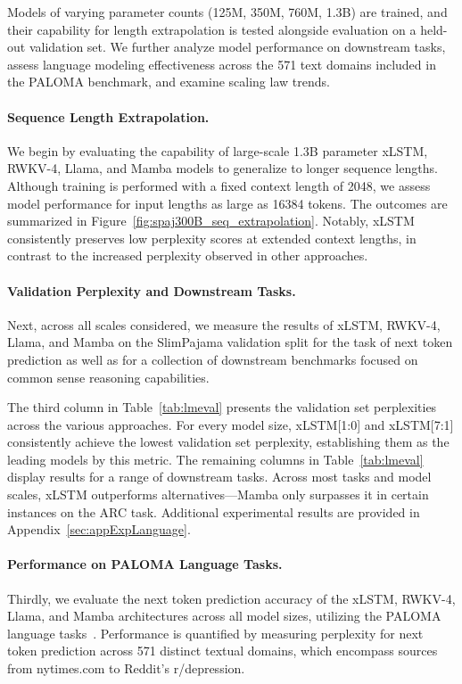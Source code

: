 Models of varying parameter counts (125M, 350M, 760M, 1.3B) are trained, and their capability for length extrapolation is tested alongside evaluation on a held-out validation set. We further analyze model performance on downstream tasks, assess language modeling effectiveness across the 571 text domains included in the PALOMA benchmark, and examine scaling law trends.

\paragraph{Sequence Length Extrapolation.}
\label{sec:spaj300B_ctx_extrapolation}
We begin by evaluating the capability of large-scale 1.3B parameter xLSTM, RWKV-4, Llama, and Mamba models to generalize to longer sequence lengths. Although training is performed with a fixed context length of 2048, we assess model performance for input lengths as large as 16384 tokens. The outcomes are summarized in Figure~\ref{fig:spaj300B_seq_extrapolation}. Notably, xLSTM consistently preserves low perplexity scores at extended context lengths, in contrast to the increased perplexity observed in other approaches.

\paragraph{Validation Perplexity and Downstream Tasks.}
\label{sec:spaj_downstream_eval}
Next, across all scales considered, we measure the results of xLSTM, RWKV-4, Llama, and Mamba on the SlimPajama validation split for the task of next token prediction as well as for a collection of downstream benchmarks focused on common sense reasoning capabilities.

The third column in Table~\ref{tab:lmeval} presents the validation set perplexities across the various approaches. For every model size, xLSTM[1:0] and xLSTM[7:1] consistently achieve the lowest validation set perplexity, establishing them as the leading models by this metric. The remaining columns in Table~\ref{tab:lmeval} display results for a range of downstream tasks. Across most tasks and model scales, xLSTM outperforms alternatives—Mamba only surpasses it in certain instances on the ARC task. Additional experimental results are provided in Appendix~\ref{sec:appExpLanguage}.

\paragraph{Performance on PALOMA Language Tasks.} Thirdly, we evaluate the next token prediction accuracy of the xLSTM, RWKV-4, Llama, and Mamba architectures across all model sizes, utilizing the PALOMA language tasks~\citep{Magnusson:23arxivshort}. Performance is quantified by measuring perplexity for next token prediction across 571 distinct textual domains, which encompass sources from nytimes.com to Reddit's r/depression. 

